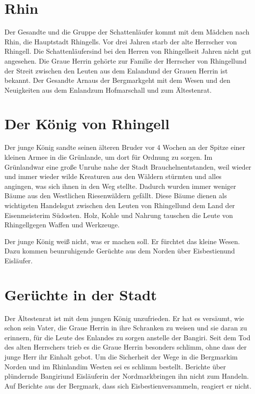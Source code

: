 \documentclass[12pt,a4paper,onecolumn,twoside,ngerman]{book}
\newcommand{\Bangiri}{Bangiri}
\newcommand{\Enland}{Enland}
\newcommand{\Schattenlaufer}{Schattenläufer}
\newcommand{\Nordmark}{Nordmark}
\newcommand{\Bergmark}{Bergmark}
\newcommand{\Arn}{Arn}
\newcommand{\Eislaufer}{Eisläufer}
\newcommand{\Eisbestien}{Eisbestien}
\newcommand{\Rhinland}{Rhinland}
\newcommand{\Rhingell}{Rhingell}
\newcommand{\Rhin}{Rhin}
\newcommand{\Grunland}{Grünland}
\newcommand{\Braucheln}{Braucheln}
\newcommand{\Eisenmeister}{Eisenmeister}
\begin{document}
\section{\Rhin}

Der Gesandte und die Gruppe der Schattenläufer kommt mit dem Mädchen nach \Rhin, die Hauptstadt \Rhingell{s}. Vor drei Jahren starb der alte Herrscher von \Rhingell. Die \Schattenlaufer sind bei den Herren von \Rhingell seit Jahren nicht gut angesehen. Die Graue Herrin gehörte zur Familie der Herrscher von \Rhingell und der Streit zwischen den Leuten aus dem \Enland und der Grauen Herrin ist bekannt. Der Gesandte \Arn aus der \Bergmark geht mit dem Wesen und den Neuigkeiten aus dem \Enland zum Hofmarschall und zum Ältestenrat.

\section{Der König von \Rhingell}
Der junge König sandte seinen älteren Bruder vor 4 Wochen an der Spitze einer kleinen Armee in die \Grunland{e}, um dort für Ordnung zu sorgen. Im \Grunland war eine große Unruhe nahe der Stadt \Braucheln entstanden, weil wieder und immer wieder wilde Kreaturen aus den Wäldern stürmten und alles angingen, was sich ihnen in den Weg stellte. Dadurch wurden immer weniger Bäume aus den Westlichen Riesenwäldern gefällt. Diese Bäume dienen als wichtigsten Handelsgut zwischen den Leuten von \Rhingell und dem Land der \Eisenmeister im Südosten. Holz, Kohle und Nahrung tauschen die Leute von \Rhingell gegen Waffen und Werkzeuge.

Der junge König weiß nicht, was er machen soll. Er fürchtet das kleine Wesen. Dazu kommen beunruhigende Gerüchte aus dem Norden über \Eisbestien und \Eislaufer. 

\section{Gerüchte in der Stadt}
Der Ältestenrat ist mit dem jungen König unzufrieden. Er hat es versäumt, wie schon sein Vater, die Graue Herrin in ihre Schranken zu weisen und sie daran zu erinnern, für die Leute des \Enland{es} zu sorgen anstelle der \Bangiri. Seit dem Tod des alten Herrschers trieb es die Graue Herrin besonders schlimm, ohne dass der junge Herr ihr Einhalt gebot. Um die Sicherheit der Wege in die \Bergmark im Norden und im \Rhinland im Westen sei es schlimm bestellt. Berichte über plündernde \Bangiri und \Eislaufer in der \Nordmark bringen ihn nicht zum Handeln. Auf Berichte aus der \Bergmark, dass sich \Eisbestien versammeln, reagiert er nicht.
\end{document}
